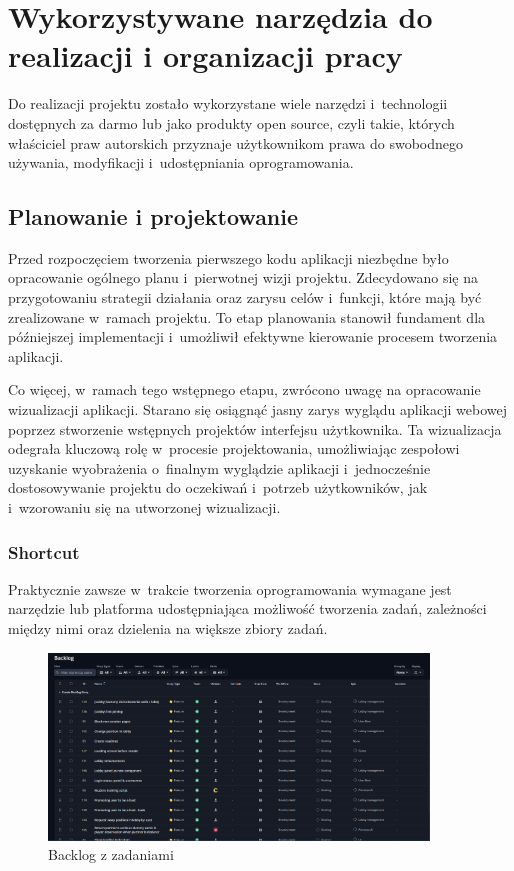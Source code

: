 \section{Wykorzystywane narzędzia do realizacji i organizacji pracy}

Do realizacji projektu zostało wykorzystane wiele narzędzi i~technologii
dostępnych za darmo lub jako produkty open source, czyli takie,
których właściciel praw autorskich przyznaje użytkownikom prawa
do swobodnego używania, modyfikacji i~udostępniania oprogramowania.


\subsection{Planowanie i projektowanie}

Przed rozpoczęciem tworzenia pierwszego kodu aplikacji niezbędne było
opracowanie ogólnego planu i~pierwotnej wizji projektu. Zdecydowano
się na przygotowaniu strategii działania oraz
zarysu celów i~funkcji, które mają być zrealizowane w~ramach projektu.
To etap planowania stanowił fundament dla późniejszej implementacji
i~umożliwił efektywne kierowanie procesem tworzenia aplikacji.

Co więcej, w~ramach tego wstępnego etapu, zwrócono uwagę na
opracowanie wizualizacji aplikacji. Starano się osiągnąć jasny
zarys wyglądu aplikacji webowej poprzez stworzenie wstępnych projektów
interfejsu użytkownika. Ta wizualizacja odegrała kluczową rolę
w~procesie projektowania, umożliwiając zespołowi uzyskanie wyobrażenia
o~finalnym wyglądzie aplikacji i~jednocześnie dostosowywanie projektu
do oczekiwań i~potrzeb użytkowników, jak i~wzorowaniu się na utworzonej
wizualizacji.


\subsubsection{Shortcut}

Praktycznie zawsze w~trakcie tworzenia oprogramowania wymagane jest
narzędzie lub platforma udostępniająca możliwość tworzenia zadań,
zależności między nimi oraz dzielenia na większe zbiory zadań.

\begin{figure}[h!]
  \centering
  \includegraphics[width=0.9\textwidth]{img/shortcut/shortcut_backlog.png}
  \caption{Backlog z zadaniami}
\end{figure}

